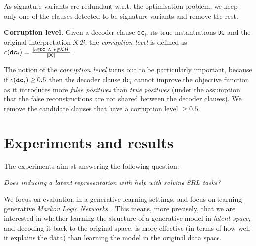 As signature variants are redundant w.r.t. the optimisation problem, we keep only one of the clauses detected to be signature variants and remove the rest.


\begin{definition}
\textbf{Corruption level.}
Given a decoder clause \texttt{dc}$_i$, its true instantiations \texttt{DC} and the original interpretation $\mathcal{KB}$, the \textit{corruption level} is defined as $c(\text{\texttt{dc}}_i) = \frac{|e \in \texttt{DC}\ \wedge\ e \not \in \mathcal{KB}|}{|\text{\texttt{DC}}|}$.
\end{definition}

The notion of the \textit{corruption level} turns out to be particularly important, because if $c(\text{\texttt{dc}}_i) \geq 0.5$ then the decoder clause \texttt{dc}$_i$ cannot improve the objective function as it introduces more \textit{false positives} than \textit{true positives} (under the assumption that the false reconstructions are not shared between the decoder clauses).
We remove the candidate clauses that have a corruption level $\geq 0.5$.





\section{Experiments and results}



The experiments aim at answering the following question:

\begin{displayquote}
\textit{Does inducing a latent  representation with  help with solving SRL tasks?}
\end{displayquote}

We focus on evaluation in a generative learning settings, and focus on learning generative \textit{Markov Logic Networks}~\cite{Richardson2006}.
This means, more precisely, that we are interested in whether learning the structure of a generative model in \textit{latent space}, and decoding it back to the original space, is more effective (in terms of how well it explains the data) than learning the model in the original data space.


